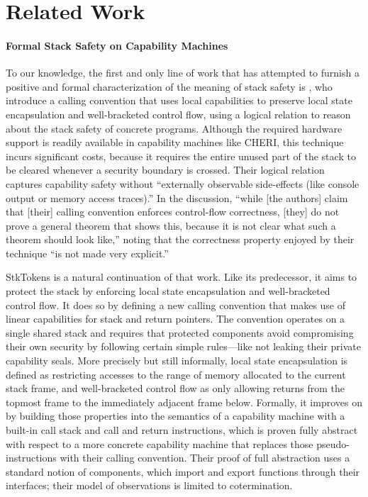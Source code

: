 \documentclass[acmsmall,review,anonymous]{acmart}\settopmatter{printfolios=true,printccs=false,printacmref=false}
\begin{document}
{{\section{Related Work}
\label{sec:relwork}


\paragraph{Formal Stack Safety on Capability Machines}
%
To our knowledge, the first and only line of work that has attempted
to furnish a positive and formal characterization of the meaning of
stack safety is \citet{Skorstengaard+19b}, who introduce a calling
convention that uses local capabilities to preserve local state
encapsulation and well-bracketed control flow, using a logical
relation to reason about the stack safety of concrete
programs. Although the required hardware support is readily available
in capability machines like CHERI, this technique incurs significant
costs, because it requires the entire unused part of the stack to be
cleared whenever a security boundary is crossed. Their logical
relation captures capability safety without ``externally observable
side-effects (like console output or memory access traces).'' In the
discussion, ``while [the authors] claim that [their] calling
convention enforces control-flow correctness, [they] do not prove a
general theorem that shows this, because it is not clear what such a
theorem should look like,'' noting that the correctness property
enjoyed by their technique ``is not made very explicit.''

StkTokens \citep{Skorstengaard+19} is a natural continuation of that work. Like
its predecessor, it aims to protect the stack by enforcing local state
encapsulation and well-bracketed control flow. It does so by defining a new
calling convention that makes use of linear capabilities for stack and return
pointers. The convention operates on a single shared stack and requires that
protected components avoid compromising their own security by following certain
simple rules---like not leaking their private capability seals. More
precisely but still informally, local state encapsulation is defined as
restricting accesses to the range of memory allocated to the current stack
frame, and well-bracketed control flow as only allowing returns from the topmost
frame to the immediately adjacent frame below. Formally, it improves on
\citet{Skorstengaard+19b} by building those properties into the semantics of a
capability machine with a built-in call stack and call and return instructions,
which is proven fully abstract with respect to a more concrete capability
machine that replaces those pseudo-instructions with their calling convention.
Their proof of full abstraction uses a standard notion of components, which
import and export functions through their interfaces; their model of
observations is limited to cotermination.

}}
\end{document}
